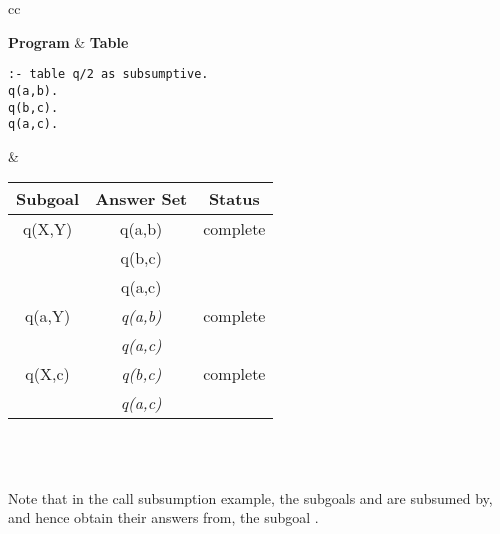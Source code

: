 \begin{center}
\begin{tabular}{cc}\hline \hline
{} \\ \hline \hline
\rule[-2ex]{0ex}{5ex} \textbf{Program} & \textbf{Table} \\
\begin{minipage}{17em}
\begin{verbatim}
:- table q/2 as subsumptive.
q(a,b).
q(b,c).
q(a,c).
\end{verbatim}
\end{minipage}
&
\begin{tabular}{|c|c|c|} \hline
  Subgoal & Answer Set & Status \\ \hline \hline
  q(X,Y) & q(a,b) & complete \\
         & q(b,c) & \\
         & q(a,c) & \\ \hline
  q(a,Y) & \textit{q(a,b)} & complete \\
         & \textit{q(a,c)} & \\ \hline
  q(X,c) & \textit{q(b,c)} & complete \\
         & \textit{q(a,c)} & \\ \hline
\end{tabular} \\
\vspace*{-2ex} \\ \hline \hline
\end{tabular}
\end{center}

\noindent
Note that in the call subsumption example, the subgoals  and
 are subsumed by, and hence obtain their answers from,
the subgoal \@.

\vspace{2ex}

